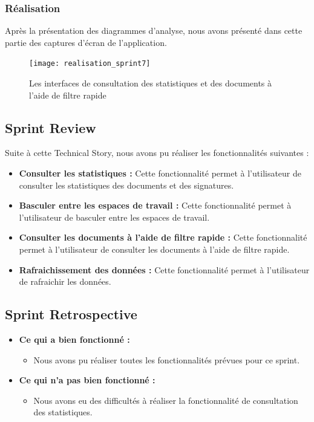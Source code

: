 \subsubsection{Réalisation}

Après la présentation des diagrammes d'analyse, nous avons présenté dans cette partie des captures d'écran de l'application.

\begin{figure}[H]
  \centering
  \texttt{[image: realisation\_sprint7]}
  \caption{Les interfaces de consultation des statistiques et des documents à l'aide de filtre rapide}
  \label{fig:realisation_sprint7}
\end{figure}

\subsection{Sprint Review}
Suite à cette Technical Story, nous avons pu réaliser les fonctionnalités suivantes :
\begin{itemize}
  \item \textbf{Consulter les statistiques :} Cette fonctionnalité permet à l'utilisateur de consulter les statistiques des documents et des signatures.
  \item \textbf{Basculer entre les espaces de travail :} Cette fonctionnalité permet à l'utilisateur de basculer entre les espaces de travail.
  \item \textbf{Consulter les documents à l'aide de filtre rapide :} Cette fonctionnalité permet à l'utilisateur de consulter les documents à l'aide de filtre rapide.
  \item \textbf{Rafraichissement des données :} Cette fonctionnalité permet à l'utilisateur de rafraichir les données.
\end{itemize}

\subsection{Sprint Retrospective}

\begin{itemize}
  \item \textbf{Ce qui a bien fonctionné :}
  \begin{itemize}
    \item Nous avons pu réaliser toutes les fonctionnalités prévues pour ce sprint.
  \end{itemize}

    \item \textbf{Ce qui n'a pas bien fonctionné :}
    \begin{itemize}
      \item Nous avons eu des difficultés à réaliser la fonctionnalité de consultation des statistiques.
    \end{itemize}
      
\end{itemize}
